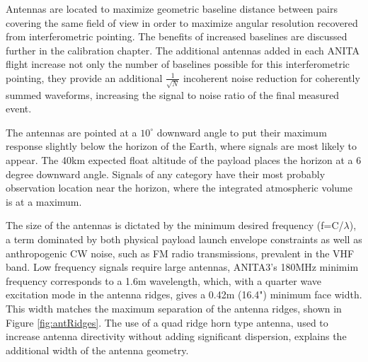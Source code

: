 	Antennas are located to maximize geometric baseline distance between pairs covering the same field of view in order to maximize angular resolution recovered from interferometric pointing.  The benefits of increased baselines are discussed further in the calibration chapter.  The additional antennas added in each ANITA flight increase not only the number of baselines possible for this interferometric pointing, they provide an additional $\frac{1}{\sqrt{N}}$ incoherent noise reduction for coherently summed waveforms, increasing the signal to noise ratio of the final measured event.  
	
	The antennas are pointed at a $10^{\circ}$ downward angle to put their maximum response slightly below the horizon of the Earth, where signals are most likely to appear.  The 40km expected float altitude of the payload places the horizon at a 6 degree downward angle.  Signals of any category have their most probably observation location near the horizon, where the integrated atmospheric volume is at a maximum.
	
	The size of the antennas is dictated by the minimum desired frequency (f=C/$\lambda$), a term dominated by both physical payload launch envelope constraints as well as anthropogenic CW noise, such as FM radio transmissions, prevalent in the VHF band. Low frequency signals require large antennas, ANITA3's 180MHz minimim frequency corresponds to a 1.6m wavelength, which, with a quarter wave excitation mode in the antenna ridges, gives a 0.42m (16.4") minimum face width.  This width matches the maximum separation of the antenna ridges, shown in Figure \ref{fig:antRidges}.  The use of a quad ridge horn type antenna, used to increase antenna directivity without adding significant dispersion, explains the additional width of the antenna geometry.
	
